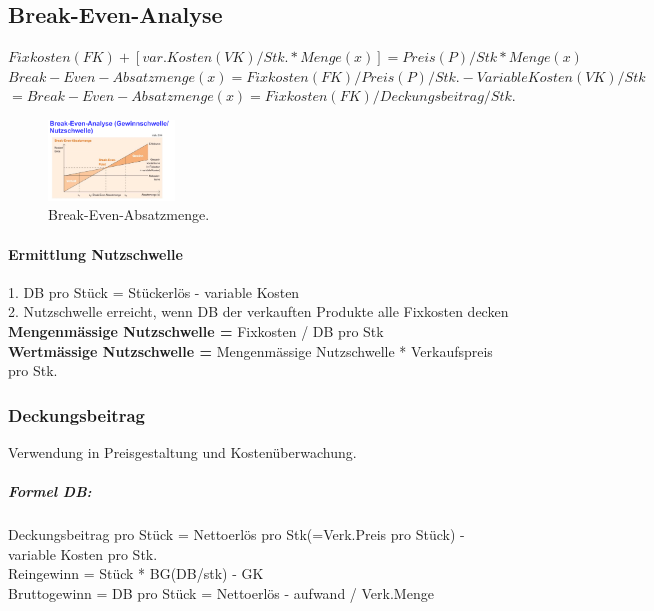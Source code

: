 \documentclass[../ZF_Wing.tex]{subfiles}
\begin{document}
\subsection{Break-Even-Analyse}
$Fixkosten(FK) + [var.Kosten(VK)/Stk. * Menge(x)] = Preis(P)/Stk * Menge(x) $\\
$Break-Even-Absatzmenge(x) = Fixkosten(FK) / Preis(P)/Stk. - Variable Kosten (VK)/Stk$ \\
$= Break-Even-Absatzmenge(x) = Fixkosten(FK) / Deckungsbeitrag/Stk.$\\
\begin{figure}[H]
\centering
\includegraphics[width=0.3\textwidth]{Resources/Image/Break-Even-Absatzmenge.png}
\caption{\label{fig:Break-Even-Absatzmenge}Break-Even-Absatzmenge.}
\end{figure}

\paragraph{Ermittlung Nutzschwelle\\}
1. DB pro Stück = Stückerlös - variable Kosten\\
2. Nutzschwelle erreicht, wenn DB der verkauften Produkte alle Fixkosten decken\\

\textbf{Mengenmässige Nutzschwelle =} Fixkosten / DB pro Stk \\
\textbf{Wertmässige Nutzschwelle =} Mengenmässige Nutzschwelle * Verkaufspreis pro Stk.\\

\subsubsection{Deckungsbeitrag}
Verwendung in Preisgestaltung und Kostenüberwachung.\\

\subparagraph{Formel DB:\\}

Deckungsbeitrag pro Stück = Nettoerlös pro Stk(=Verk.Preis pro Stück) - variable Kosten pro Stk.\\


Reingewinn = Stück * BG(DB/stk) - GK \\

Bruttogewinn = DB pro Stück = Nettoerlös - aufwand / Verk.Menge \\
\end{document}
